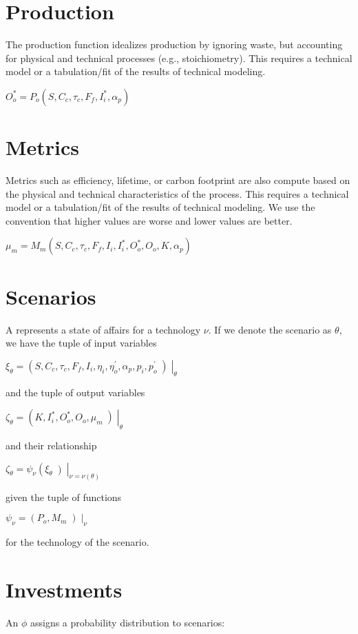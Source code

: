 \documentclass[letterpaper,10pt,english]{sphinxmanual}
\begin{document}
\section{Production}
\label{\detokenize{formulation:production}}
The production function idealizes production by ignoring waste, but
accounting for physical and technical processes (e.g., stoichiometry).
This requires a technical model or a tabulation/fit of the results of
technical modeling.

\(O^*_o = P_o(S, C_c, \tau_c, F_f, I^*_i, \alpha_p)\)


\section{Metrics}
\label{\detokenize{formulation:metrics}}
Metrics such as efficiency, lifetime, or carbon footprint are also
compute based on the physical and technical characteristics of the
process. This requires a technical model or a tabulation/fit of the
results of technical modeling. We use the convention that higher values
are worse and lower values are better.

\(\mu_m = M_m(S, C_c, \tau_c, F_f, I_i, I^*_i, O^*_o, O_o, K, \alpha_p)\)


\section{Scenarios}
\label{\detokenize{formulation:scenarios}}
A  represents a state of affairs for a technology \(\nu\).
If we denote the scenario as \(\theta\), we have the tuple of input
variables

\(\xi_\theta = \left(S, C_c, \tau_c, F_f, I_i, \eta_i, \eta^\prime_o, \alpha_p, p_i, p^\prime_o\middle) \right|_\theta\)

and the tuple of output variables

\(\zeta_\theta = \left(K, I^*_i, O^*_o, O_o, \mu_m\middle) \right|_\theta\)

and their relationship

\(\zeta_\theta = \psi_\nu\left(\xi_\theta\middle) \right|_{\nu = \nu(\theta)}\)

given the tuple of functions

\(\psi_\nu = \left(P_o, M_m\middle) \right|_\nu\)

for the technology of the scenario.


\section{Investments}
\label{\detokenize{formulation:investments}}
An  \(\phi\) assigns a probability distribution to
scenarios:
\end{document}
